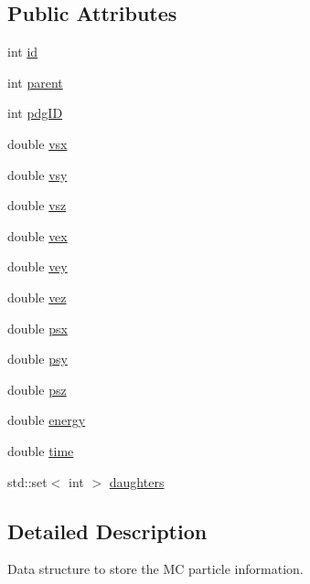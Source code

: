 \subsection*{Public Attributes}
\begin{DoxyCompactItemize}
\item 
int \hyperlink{class_d_d4hep_1_1_d_d_eve_particle_a230cb6bfdbe03751bc0d2b84da8d32b3}{id}
\item 
int \hyperlink{class_d_d4hep_1_1_d_d_eve_particle_aa405afce24519cce61999543be3f0d33}{parent}
\item 
int \hyperlink{class_d_d4hep_1_1_d_d_eve_particle_af205b9bbb31c48d31d62a2c5013ff4cd}{pdg\+ID}
\item 
double \hyperlink{class_d_d4hep_1_1_d_d_eve_particle_a28dbdeb3997f9b8342ccd4c9e6991a92}{vsx}
\item 
double \hyperlink{class_d_d4hep_1_1_d_d_eve_particle_a44cd9286a2e84819c40fc89f426fe322}{vsy}
\item 
double \hyperlink{class_d_d4hep_1_1_d_d_eve_particle_a8b93479f6e6812a6902a8574fce930e9}{vsz}
\item 
double \hyperlink{class_d_d4hep_1_1_d_d_eve_particle_ae4631ff73de167405ea1c680f5217172}{vex}
\item 
double \hyperlink{class_d_d4hep_1_1_d_d_eve_particle_a3e6f78f4ccc5d78ae52a28c33fcf0b44}{vey}
\item 
double \hyperlink{class_d_d4hep_1_1_d_d_eve_particle_ad573d5c2205c4d4c6908637c34f9233a}{vez}
\item 
double \hyperlink{class_d_d4hep_1_1_d_d_eve_particle_afbc3020b2ad0f4df7b3c36929d4cd11e}{psx}
\item 
double \hyperlink{class_d_d4hep_1_1_d_d_eve_particle_a5e678bef386cffdab92eaebca644cdd1}{psy}
\item 
double \hyperlink{class_d_d4hep_1_1_d_d_eve_particle_ac1ff170f07e4abcecc63bf1c31294de4}{psz}
\item 
double \hyperlink{class_d_d4hep_1_1_d_d_eve_particle_ac874addd7f825b87415e65722860743d}{energy}
\item 
double \hyperlink{class_d_d4hep_1_1_d_d_eve_particle_ad15d69211063590b587d7ba6ff0d8726}{time}
\item 
std\+::set$<$ int $>$ \hyperlink{class_d_d4hep_1_1_d_d_eve_particle_a6cd73e254f4338306c06c54e1a9f2843}{daughters}
\end{DoxyCompactItemize}


\subsection{Detailed Description}
Data structure to store the MC particle information. 

